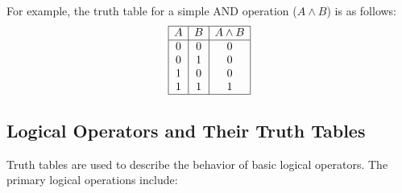 For example, the truth table for a simple AND operation (\( A \land B \)) is as follows:
\[
\begin{array}{|c|c|c|}
\hline
A & B & A \land B \\
\hline
0 & 0 & 0 \\
0 & 1 & 0 \\
1 & 0 & 0 \\
1 & 1 & 1 \\
\hline
\end{array}
\]

\subsection{Logical Operators and Their Truth Tables}
Truth tables are used to describe the behavior of basic logical operators. The primary logical operations include:
